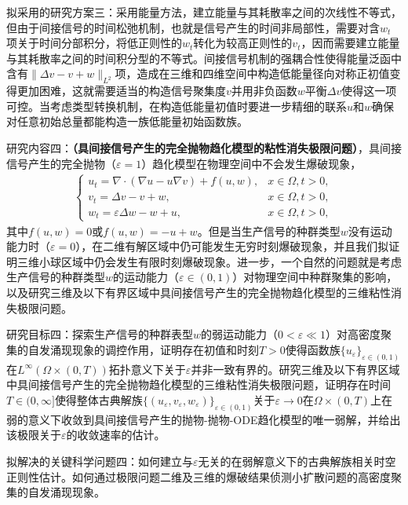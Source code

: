 \documentclass[12pt]{article}
\begin{document}
拟采用的研究方案三：采用能量方法，建立能量与其耗散率之间的次线性不等式，但由于间接信号的时间松弛机制，也就是信号产生的时间非局部性，需要对含$w_t$项关于时间分部积分，将低正则性的$w_t$转化为较高正则性的$v_t$，因而需要建立能量与其耗散率之间的时间积分型的不等式。间接信号机制的强耦合性使得能量泛函中含有$\|\Delta v-v+w\|_{L^2}$项，造成在三维和四维空间中构造低能量径向对称正初值变得更加困难，这就需要适当的构造信号聚集度$v$并用非负函数$w$平衡$\Delta v$使得这一项可控。当考虑类型转换机制，在构造低能量初值时要进一步精细的联系$u$和$w$确保对任意初始总量都能构造一族低能量初始函数族。

研究内容四：\textbf{（具间接信号产生的完全抛物趋化模型的粘性消失极限问题）}，具间接信号产生的完全抛物（$\varepsilon=1$）趋化模型在物理空间中不会发生爆破现象，
\begin{align}
    \begin{cases}
      \label{sys: ks isp ppviscosity}
        u_t =  \nabla\cdot(\nabla u - u\nabla v) + f(u,w),& x\in\Omega, t>0,\\
        v_t =  \Delta v - v + w,& x\in\Omega,	 t>0,\\
        w_t  = \varepsilon \Delta w - w + u, & x\in\Omega, t > 0, 
    \end{cases}
\end{align}
其中$f(u,w)=0$或$f(u,w)=-u+w$。但是当生产信号的种群类型$w$没有运动能力时（$\varepsilon=0$），在二维有解区域中仍可能发生无穷时刻爆破现象，并且我们拟证明三维小球区域中仍会发生有限时刻爆破现象。进一步，一个自然的问题就是考虑生产信号的种群类型$w$的运动能力（$\varepsilon\in(0,1)$）对物理空间中种群聚集的影响，以及研究三维及以下有界区域中具间接信号产生的完全抛物趋化模型的三维粘性消失极限问题。

研究目标四：探索生产信号的种群表型$w$的弱运动能力（$0<\varepsilon\ll 1$）对高密度聚集的自发涌现现象的调控作用，证明存在初值和时刻$T>0$使得函数族$\{u_\varepsilon\}_{\varepsilon\in(0,1)}$在$L^\infty(\Omega\times(0,T))$拓扑意义下关于$\varepsilon$并非一致有界的。研究三维及以下有界区域中具间接信号产生的完全抛物趋化模型的三维粘性消失极限问题，证明存在时间$T\in(0,\infty]$使得整体古典解族$\{(u_\varepsilon,v_\varepsilon,w_\varepsilon)\}_{\varepsilon\in(0,1)}$关于$\varepsilon\to0$在$\Omega\times(0,T)$上在弱的意义下收敛到具间接信号产生的抛物-抛物-ODE趋化模型的唯一弱解，并给出该极限关于$\varepsilon$的收敛速率的估计。

拟解决的关键科学问题四：如何建立与$\varepsilon$无关的在弱解意义下的古典解族相关时空正则性估计。如何通过极限问题二维及三维的爆破结果侦测小扩散问题的高密度聚集的自发涌现现象。
\end{document}

